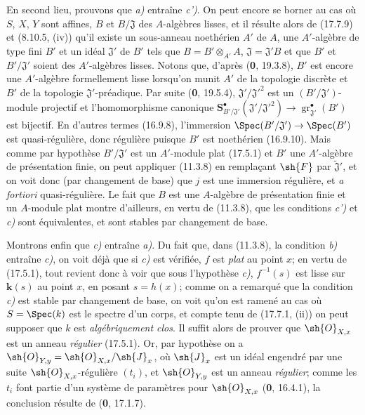 En second lieu, prouvons que \emph{a)} entraîne \emph{c')}. On peut encore se borner au cas où $S$, $X$, $Y$ sont affines, $B$ et $B/\mathfrak J$ des $A$-algèbres lisses, et il résulte alors de (17.7.9) et (8.10.5, (iv)) qu'il existe un sous-anneau noethérien $A'$ de $A$, une $A'$-algèbre de type fini $B'$ et un idéal $\mathfrak J'$ de $B'$ tels que $B=B'\otimes_{A'}A$, $\mathfrak J=\mathfrak J'B$ et que $B'$ et $B'/\mathfrak J'$ soient des $A'$-algèbres lisses. Notons que, d'après (\textbf{0}, 19.3.8), $B'$ est encore une $A'$-algèbre formellement lisse lorsqu'on munit $A'$ de la topologie discrète et $B'$ de la topologie $\mathfrak J'$-préadique. Par suite (\textbf{0}, 19.5.4), $\mathfrak J'/\mathfrak J'^2$ est un $(B'/\mathfrak J')$-module projectif et l'homomorphisme canonique $\mathbf{S}^{\bullet}_{B'/\mathfrak J'}(\mathfrak J'/\mathfrak J'^2)\to\operatorname{gr}_{\mathfrak J'}^{\bullet}(B')$ est bijectif. En d'autres termes (16.9.8), l'immersion $\Spec(B'/\mathfrak J')\to\Spec(B')$ est quasi-régulière, donc régulière puisque $B'$ est noethérien (16.9.10). Mais comme par hypothèse $B'/\mathfrak J'$ est un $A'$-module plat (17.5.1) et $B'$ une $A'$-algèbre de présentation finie, on peut appliquer (11.3.8) en remplaçant $\sh{F}$ par $\widetilde{\mathfrak J}'$, et on voit donc (par changement de base) que $j$ est une immersion régulière, et \emph{a fortiori} quasi-régulière. Le fait que $B$ est une $A$-algèbre de présentation finie et un $A$-module plat montre d'ailleurs, en vertu de (11.3.8), que les conditions \emph{c')} et \emph{c)} sont équivalentes, et sont stables par changement de base.

Montrons enfin que \emph{c)} entraîne \emph{a)}. Du fait que, dans (11.3.8), la condition \emph{b)} entraîne \emph{c)}, on voit déjà que si \emph{c)} est vérifiée, $f$ est \emph{plat} au point $x$; en vertu de (17.5.1), tout revient donc à voir que sous l'hypothèse \emph{c)}, $f^{-1}(s)$ est lisse sur $\boldsymbol{k}(s)$ au point $x$, en posant $s=h(x)$; comme on a remarqué que la condition \emph{c)} est stable par changement de base, on voit qu'on est ramené au cas où $S=\Spec(k)$ est le spectre d'un corps, et compte tenu de (17.7.1, (ii)) on peut supposer que $k$ est \emph{algébriquement clos}. Il suffit alors de prouver que $\sh{O}_{X,x}$ est un anneau \emph{régulier} (17.5.1). Or, par hypothèse on a $\sh{O}_{Y,y}=\sh{O}_{X,x}/\sh{J}_x$, où $\sh{J}_x$ est un idéal engendré par une suite $\sh{O}_{X,x}$-régulière $(t_i)$, et $\sh{O}_{Y,y}$ est un anneau \emph{régulier}; comme les $t_i$ font partie d'un système de paramètres pour $\sh{O}_{X,x}$ (\textbf{0}, 16.4.1), la conclusion résulte de (\textbf{0}, 17.1.7).


